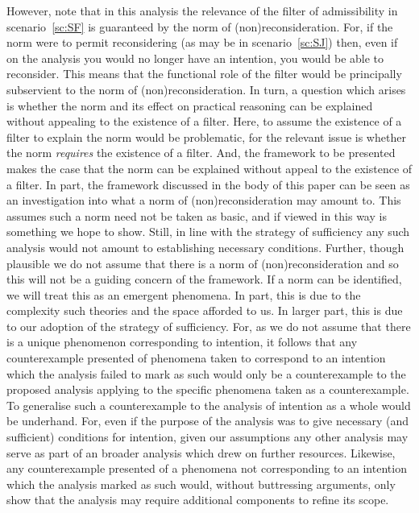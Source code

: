 \documentclass[10pt]{article}
\begin{document}
{  However, note that in this analysis the relevance of the filter of admissibility in scenario~\ref{sc:SF} is guaranteed by the norm of (non)reconsideration.
  For, if the norm were to permit reconsidering (as may be in scenario~\ref{sc:SJ}) then, even if on the analysis you would no longer have an intention, you would be able to reconsider.
  This means that the functional role of the filter would be principally subservient to the norm of (non)reconsideration.
  In turn, a question which arises is whether the norm and its effect on practical reasoning can be explained without appealing to the existence of a filter.
  Here, to assume the existence of a filter to explain the norm would be problematic, for the relevant issue is whether the norm \emph{requires} the existence of a filter.
  And, the framework to be presented makes the case that the norm can be explained without appeal to the existence of a filter.
  In part, the framework discussed in the body of this paper can be seen as an investigation into what a norm of (non)reconsideration may amount to.
  This assumes such a norm need not be taken as basic, and if viewed in this way is something we hope to show.
  Still, in line with the strategy of sufficiency any such analysis would not amount to establishing necessary conditions.
  Further, though plausible we do not assume that there is a norm of (non)reconsideration and so this will not be a guiding concern of the framework.
  If a norm can be identified, we will treat this as an emergent phenomena.
}
In part, this is due to the complexity such theories and the space afforded to us.
In larger part, this is due to our adoption of the strategy of sufficiency.
For, as we do not assume that there is a unique phenomenon corresponding to intention, it follows that any counterexample presented of phenomena taken to correspond to an intention which the analysis failed to mark as such would only be a counterexample to the proposed analysis applying to the specific phenomena taken as a counterexample.
To generalise such a counterexample to the analysis of intention as a whole would be underhand.
For, even if the purpose of the analysis was to give necessary (and sufficient) conditions for intention, given our assumptions any other analysis may serve as part of an broader analysis which drew on further resources.
Likewise, any counterexample  presented of a phenomena not corresponding to an intention which the analysis marked as such would, without buttressing arguments, only show that the analysis may require additional components to refine its scope.%
\end{document}
